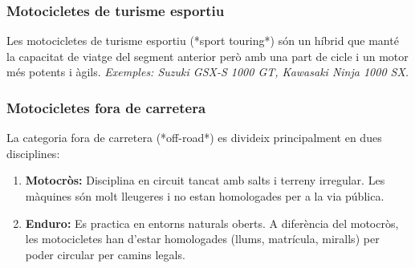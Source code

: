 \subsubsection{Motocicletes de turisme esportiu}
Les motocicletes de turisme esportiu (*sport touring*) són un híbrid que manté la capacitat de viatge del segment anterior però amb una part de cicle i un motor més potents i àgils.
\textit{Exemples: Suzuki GSX-S 1000 GT, Kawasaki Ninja 1000 SX.}

\subsubsection{Motocicletes fora de carretera}
La categoria fora de carretera (*off-road*) es divideix principalment en dues disciplines:

\begin{enumerate}
    \item \textbf{Motocròs:} Disciplina en circuit tancat amb salts i terreny irregular. Les màquines són molt lleugeres i no estan homologades per a la via pública.
    \item \textbf{Enduro:} Es practica en entorns naturals oberts. A diferència del motocròs, les motocicletes han d'estar homologades (llums, matrícula, miralls) per poder circular per camins legals.
\end{enumerate}